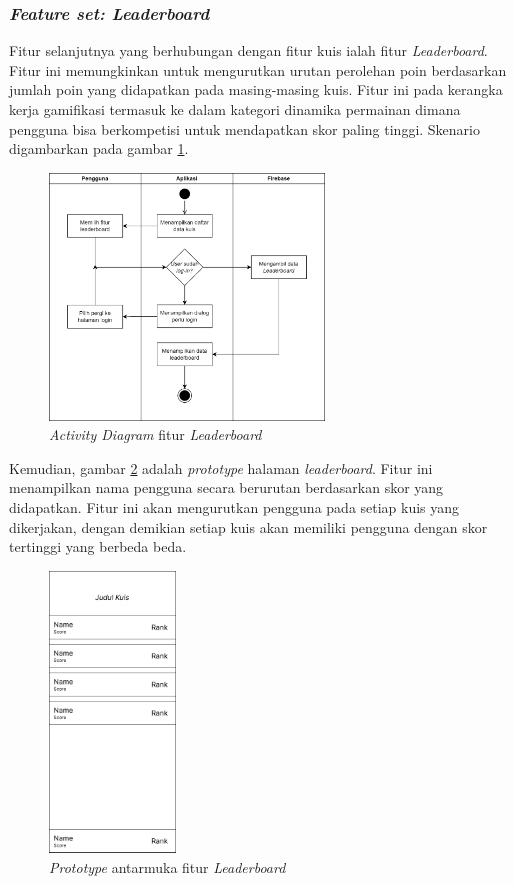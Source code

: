 \subsubsection{\textit{Feature set: Leaderboard}}
Fitur selanjutnya yang berhubungan dengan fitur kuis ialah fitur \textit{Leaderboard}. 
Fitur ini memungkinkan untuk mengurutkan urutan perolehan poin berdasarkan jumlah poin yang didapatkan pada masing-masing kuis.
Fitur ini pada kerangka kerja gamifikasi termasuk ke dalam kategori dinamika permainan dimana pengguna bisa berkompetisi untuk mendapatkan skor paling tinggi.
Skenario digambarkan pada gambar \ref*{Fig:ActivityLeaderboard}.
\begin{figure}[H]
	\centering
	\includegraphics[width=0.65\textwidth]{contents/chapter-3/images/AD-leaderboard.png}
	\caption{\textit{Activity Diagram} fitur \textit{Leaderboard}}
	\label{Fig:ActivityLeaderboard}
\end{figure}
Kemudian, gambar \ref*{Fig:ActivityLeaderboard2} adalah \textit{prototype} halaman \textit{leaderboard}.
Fitur ini menampilkan nama pengguna secara berurutan berdasarkan skor yang didapatkan.
Fitur ini akan mengurutkan pengguna pada setiap kuis yang dikerjakan, dengan demikian setiap kuis akan memiliki pengguna dengan skor tertinggi yang berbeda beda.
\begin{figure}[H]
	\centering
	\includegraphics[width=0.3\textwidth]{contents/chapter-3/images/MF-leaderboard.png}
	\caption{\textit{Prototype} antarmuka fitur \textit{Leaderboard}}
	\label{Fig:ActivityLeaderboard2}
\end{figure}
